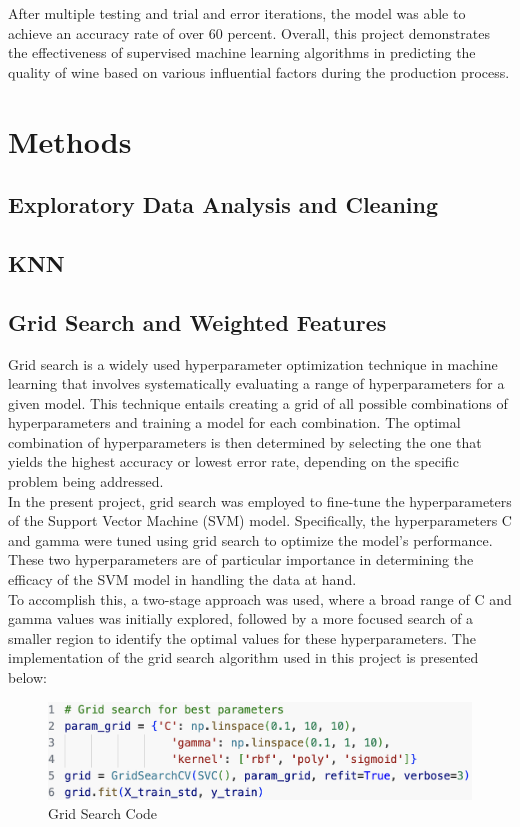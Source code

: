 \documentclass[conference]{IEEEtran}
\begin{document}
After multiple testing and trial and error iterations, the model was able to achieve an accuracy rate of over 60 percent. Overall, this project demonstrates the effectiveness of supervised machine learning algorithms in predicting the quality of wine based on various influential factors during the production process.\\

\section{Methods}
\subsection{Exploratory Data Analysis and Cleaning}
\subsection{KNN}
\subsection{Grid Search and Weighted Features}
Grid search is a widely used hyperparameter optimization technique in machine learning that involves systematically evaluating a range of hyperparameters for a given model. This technique entails creating a grid of all possible combinations of hyperparameters and training a model for each combination. The optimal combination of hyperparameters is then determined by selecting the one that yields the highest accuracy or lowest error rate, depending on the specific problem being addressed.\\
In the present project, grid search was employed to fine-tune the hyperparameters of the Support Vector Machine (SVM) model. Specifically, the hyperparameters C and gamma were tuned using grid search to optimize the model's performance. These two hyperparameters are of particular importance in determining the efficacy of the SVM model in handling the data at hand.\\
To accomplish this, a two-stage approach was used, where a broad range of C and gamma values was initially explored, followed by a more focused search of a smaller region to identify the optimal values for these hyperparameters. The implementation of the grid search algorithm used in this project is presented below:
	\begin{figure}[h]
	\label{fig:foo}
	\begin{center}
	\includegraphics[scale=0.35]{gridSearch.png}
	\caption{Grid Search Code}
	\end{center}
	\end{figure}
\end{document}
